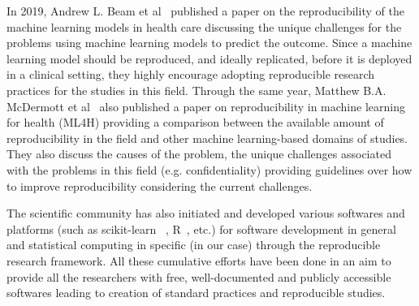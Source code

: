 In 2019, Andrew L. Beam et al~\cite{beam_challenges_2020} published a paper on the reproducibility 
of the machine learning models in health care discussing the unique challenges for the problems using machine learning 
models to predict the outcome. Since a machine learning model should be reproduced, and ideally replicated, before it 
is deployed in a clinical setting, they highly encourage adopting reproducible research practices for the studies in 
this field. Through the same year, Matthew B.A. McDermott et al~\cite{mcdermott_reproducibility_2019} 
also published a paper on reproducibility in machine learning for health (ML4H) providing a comparison between the 
available amount of reproducibility in the field and other machine learning-based domains of studies. 
They also discuss the causes of the problem, the unique challenges associated with the problems in this field 
(e.g. confidentiality) providing guidelines over how to improve reproducibility considering the current challenges.

The scientific community has also initiated and developed various softwares and platforms (such as 
scikit-learn ~\cite{pedregosa_scikit-learn_2018}, R~\cite{chambers_software_2008},  etc.) for software development in general and 
statistical computing in specific (in our case) through the reproducible research framework. All these cumulative 
efforts have been done in an aim to provide all the researchers with free, well-documented and publicly accessible 
softwares leading to creation of standard practices and reproducible studies.
